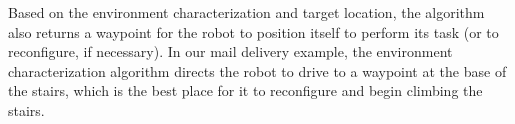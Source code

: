 \documentclass[journal]{IEEEtran}
\begin{document}

Based on the environment characterization and target location, the algorithm also returns a waypoint for the robot to position itself to perform its task (or to reconfigure, if necessary).  In our mail delivery example, the environment characterization algorithm directs the robot to drive to a waypoint at the base of the stairs, which is the best place for it to reconfigure and begin climbing the stairs.
\end{document}
